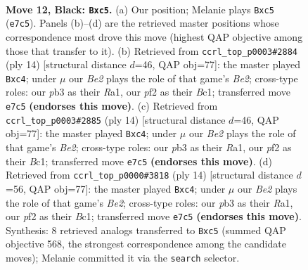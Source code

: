 \documentclass[11pt]{article}
\begin{document}
\clearpage

\begin{figure}[p]\centering
\begin{subfigure}{0.46\textwidth}\centering
\resizebox{\linewidth}{!}{%
\newchessgame
\chessboard[
  setfen={2bq1rk1/1p2bp1p/r1n2np1/p1Pp4/P7/1P2PNP1/5PBP/RNBQ1RK1 b - - 0 12},
  showmover=false,
  pgfstyle=straightmove, color=movearrow, markmove={e7-c5}
]}
\caption{}
\end{subfigure}\hfill
\begin{subfigure}{0.46\textwidth}\centering
\resizebox{\linewidth}{!}{%
\newchessgame
\chessboard[
  setfen={rnbq1rk1/p1p1ppbp/1p3np1/8/2pP4/2N1PN2/PP2BPPP/R1BQ1RK1 w - - 0 8},
  showmover=false,
  pgfstyle=straightmove, color=movearrow, markmove={e2-c4}
]}
\caption{}
\end{subfigure}
\\[4pt]
\begin{subfigure}{0.46\textwidth}\centering
\resizebox{\linewidth}{!}{%
\newchessgame
\chessboard[
  setfen={rnbq1rk1/p1p1ppbp/1p3np1/8/2pP4/2N1PN2/PP2BPPP/R1BQ1RK1 w - - 0 8},
  showmover=false,
  pgfstyle=straightmove, color=movearrow, markmove={e2-c4}
]}
\caption{}
\end{subfigure}\hfill
\begin{subfigure}{0.46\textwidth}\centering
\resizebox{\linewidth}{!}{%
\newchessgame
\chessboard[
  setfen={rnbq1rk1/1pp1ppbp/p4np1/8/2pP4/2N1PN2/PP2BPPP/R1BQ1RK1 w - - 0 8},
  showmover=false,
  pgfstyle=straightmove, color=movearrow, markmove={e2-c4}
]}
\caption{}
\end{subfigure}
\caption{\textbf{Move 12, Black: \texttt{Bxc5}.} (a) Our position; Melanie plays \texttt{Bxc5} (\texttt{e7c5}). Panels (b)--(d) are the retrieved master positions whose correspondence most drove this move (highest QAP objective among those that transfer to it). (b) Retrieved from \texttt{ccrl\_top\_p0003\#2884} (ply 14) [structural distance $d$=46, QAP obj=77]: the master played \texttt{Bxc4}; under $\mu$ our \emph{Be2} plays the role of that game's \emph{Be2}; cross-type roles: our \emph{p}b3 as their \emph{R}a1, our \emph{p}f2 as their \emph{B}c1; transferred move \texttt{e7c5} \textbf{(endorses this move)}. (c) Retrieved from \texttt{ccrl\_top\_p0003\#2885} (ply 14) [structural distance $d$=46, QAP obj=77]: the master played \texttt{Bxc4}; under $\mu$ our \emph{Be2} plays the role of that game's \emph{Be2}; cross-type roles: our \emph{p}b3 as their \emph{R}a1, our \emph{p}f2 as their \emph{B}c1; transferred move \texttt{e7c5} \textbf{(endorses this move)}. (d) Retrieved from \texttt{ccrl\_top\_p0000\#3818} (ply 14) [structural distance $d$=56, QAP obj=77]: the master played \texttt{Bxc4}; under $\mu$ our \emph{Be2} plays the role of that game's \emph{Be2}; cross-type roles: our \emph{p}b3 as their \emph{R}a1, our \emph{p}f2 as their \emph{B}c1; transferred move \texttt{e7c5} \textbf{(endorses this move)}. Synthesis: 8 retrieved analogs transferred to \texttt{Bxc5} (summed QAP objective 568, the strongest correspondence among the candidate moves); Melanie committed it via the \texttt{search} selector.}
\label{fig:thought-m23}
\end{figure}
\end{document}
